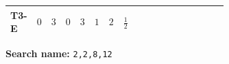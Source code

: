 \documentclass[8pt]{article}
\begin{document}
\begin{landscape}
\begin{longtable}{@{}llcccccc >{\raggedright\arraybackslash}p{0.21\linewidth} >{\raggedright\arraybackslash}p{0.21\linewidth} >{\raggedright\arraybackslash}p{0.21\linewidth}@{}}
T3-E & $0$ & $3$ & $0$ & $3$ & $1$ & $2$ & $\frac{1}{2}$ & \scriptsize\adjustbox{max width=\linewidth}{$\begin{gathered} - \frac{\sqrt{3} lambda12Inv1 \overline{y_{1}} \overline{y_{2}}}{6 MF}\end{gathered}$} & \scriptsize\adjustbox{max width=\linewidth}{$\begin{gathered} \frac{\sqrt{3} g_{1}^{2} \overline{y_{1}} \overline{y_{2}}}{8 MF}\end{gathered}$} & \scriptsize\adjustbox{max width=\linewidth}{$\begin{gathered} \frac{3 \sqrt{11} lambda12Inv2 \overline{y_{1}} \overline{y_{2}}}{22 MF}\end{gathered}$} \\
\midrule
\bottomrule
\end{longtable}
\clearpage
\noindent\textbf{Search name: }\texttt{2,2,8,12}\par\smallskip

\end{landscape}
\end{document}

